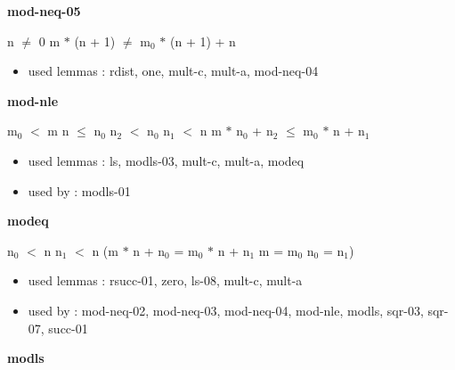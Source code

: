 \documentclass[a4paper]{article}
\begin{document}
\medskip

\bigskip

{\large\bf mod-neq-05}

\medskip

 \Fol n $\neq$ 0 \Imp m $*$ (n + 1) $\neq$ $\mbox{m}_{0}$ $*$ (n + 1) + n

\begin{itemize}


\item       used lemmas  : rdist, one, mult-c, mult-a, mod-neq-04

\end{itemize}

\medskip

\bigskip

{\large\bf mod-nle}

\medskip

 \Fol $\mbox{m}_{0}$ $<$ m \And n $\le$ $\mbox{n}_{0}$ \And $\mbox{n}_{2}$ $<$ $\mbox{n}_{0}$ \And $\mbox{n}_{1}$ $<$ n \Imp \Not m $*$ $\mbox{n}_{0}$ + $\mbox{n}_{2}$ $\le$ $\mbox{m}_{0}$ $*$ n + $\mbox{n}_{1}$

\begin{itemize}


\item       used lemmas  : ls, modls-03, mult-c, mult-a, modeq
\item       used by      : modls-01

\end{itemize}

\medskip

\bigskip

{\large\bf modeq}

\medskip

 \Fol $\mbox{n}_{0}$ $<$ n \And $\mbox{n}_{1}$ $<$ n \Imp (m $*$ n + $\mbox{n}_{0}$ = $\mbox{m}_{0}$ $*$ n + $\mbox{n}_{1}$ \Equiv m = $\mbox{m}_{0}$ \And $\mbox{n}_{0}$ = $\mbox{n}_{1}$)

\begin{itemize}


\item       used lemmas  : rsucc-01, zero, ls-08, mult-c, mult-a
\item       used by      : mod-neq-02, mod-neq-03, mod-neq-04, mod-nle, modls, sqr-03, sqr-07, succ-01

\end{itemize}

\medskip

\bigskip

{\large\bf modls}
\end{document}
